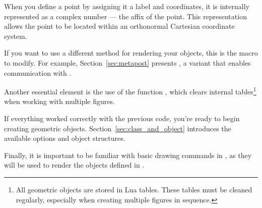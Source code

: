 When you define a point by assigning it a label and coordinates, it is internally represented as a complex number — the affix of the point. This representation allows the point to be located within an orthonormal Cartesian coordinate system.

If you want to use a different method for rendering your objects, this is the macro to modify. For example, Section~\ref{sec:metapost} presents , a variant that enables communication with .

Another essential element is the use of the function , which clears internal tables\footnote{All geometric objects are stored in Lua tables. These tables must be cleaned regularly, especially when creating multiple figures in sequence.} when working with multiple figures.

If everything worked correctly with the previous code, you're ready to begin creating geometric objects. Section~\ref{sec:class_and_object} introduces the available options and object structures.

Finally, it is important to be familiar with basic drawing commands in , as they will be used to render the objects defined in .
\endinput